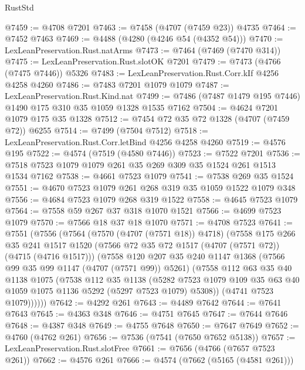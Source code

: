\begin{lexlean}{RustStd}
\begin{coremodule}
{\begin{coremodule}
{{{{{{{{{{{{{{{{{{{{{{{{{{{{{{{{{{{@7459 := @4708 @7201
@7463 := @7458 (@4707 (@7459 @23)) @4735
@7464 := @7452 @7463
@7469 := @4488 (@4280 (@4246 @54 (@4352 @54)))
@7470 := LexLeanPreservation.Rust.natArms
@7473 := @7464 (@7469 (@7470 @314))
@7475 := LexLeanPreservation.Rust.slotOK @7201
@7479 := @7473 (@4766 (@7475 @7446)) @5326
@7483 := LexLeanPreservation.Rust.Corr.kIf @4256 @4258 @4260
@7486 := @7483 @7201 @1079 @1079
@7487 := LexLeanPreservation.Rust.Kind.nat
@7499 := @7486 (@7487 @1479 @195 @7446) @1490 @175 @310 @35 @1059 @1328 @1535 @7162
@7504 := @4624 @7201 @1079 @175 @35 @1328
@7512 := @7454 @72 @35 @72 @1328 (@4707 (@7459 @72)) @6255
@7514 := @7499 (@7504 @7512)
@7518 := LexLeanPreservation.Rust.Corr.letBind @4256 @4258 @4260
@7519 := @4576 @195
@7522 := @4574 (@7519 (@4580 @7446))
@7523 := @7522 @7201
@7536 := @7518 @7523 @1079 @1079 @261 @35 @269 @309 @35 @1524 @261 @1513 @1534 @7162
@7538 := @4661 @7523 @1079
@7541 := @7538 @269 @35 @1524
@7551 := @4670 @7523 @1079 @261 @268 @319 @35 @1059 @1522 @1079 @348
@7556 := @4684 @7523 @1079 @268 @319 @1522
@7558 := @4645 @7523 @1079
@7564 := @7558 @59 @267 @37 @318 @1070 @1521
@7566 := @4699 @7523 @1079
@7570 := @7566 @18 @37 @18 @1070
@7571 := @4708 @7523
@7641 := @7551
    (@7556
      (@7564
        (@7570 (@4707 (@7571 @18)) @4718)
        (@7558
          @175
          @266
          @35
          @241
          @1517
          @1520
          (@7566 @72 @35 @72 @1517 (@4707 (@7571 @72)) (@4715 (@4716 @1517)))
          (@7558
            @120
            @207
            @35
            @240
            @1147
            @1368
            (@7566 @99 @35 @99 @1147 (@4707 (@7571 @99)) @5261)
            (@7558
              @112
              @63
              @35
              @40
              @1138
              @1075
              (@7538
                @112
                @35
                @1138
                (@5282
                  @7523
                  @1079
                  @109
                  @35
                  @63
                  @40
                  @1059
                  @1075
                  @1136
                  @5292
                  (@5297 @7523 @1079)
                  @5308))
              (@4741 @7523 @1079))))))
@7642 := @4292 @261
@7643 := @4489 @7642
@7644 := @7641 @7643
@7645 := @4363 @348
@7646 := @4751 @7645
@7647 := @7644 @7646
@7648 := @4387 @348
@7649 := @4755 @7648
@7650 := @7647 @7649
@7652 := @4760 (@4762 @261)
@7656 := @7536 (@7541 (@7650 @7652 @5138))
@7657 := LexLeanPreservation.Rust.slotFree
@7661 := @7656 (@4766 (@7657 @7523 @261))
@7662 := @4576 @261
@7666 := @4574 (@7662 (@5165 (@4581 @261)))
}}}}}}}}}}}}}}}}}}}}}}}}}}}}}}}}}}}
\end{coremodule}}
\end{coremodule}
\end{lexlean}
